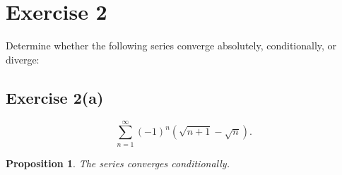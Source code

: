 \documentclass[12pt]{article}
\newtheorem{proposition}{Proposition}
\newenvironment{problem}
    {\begin{lrbox}{\mybox}\begin{minipage}{0.98\textwidth}}
    {\end{minipage}\end{lrbox}\framebox[\textwidth]{\usebox{\mybox}}}
\newcommand{\<}{\left\langle} %
\renewcommand{\>}{\right\rangle} %
\begin{document}
\newpage
\section*{Exercise 2}
\begin{problem}
    Determine whether the following series converge absolutely, conditionally, or diverge:
\end{problem}

\subsection*{Exercise 2(a)}
\begin{problem}
    \begin{equation}
        \sum_{n=1}^\infty (-1)^n (\sqrt{n+1}-\sqrt{n}).
    \end{equation}
\end{problem}

\begin{proposition}
    The series converges conditionally.
\end{proposition}
\end{document}
